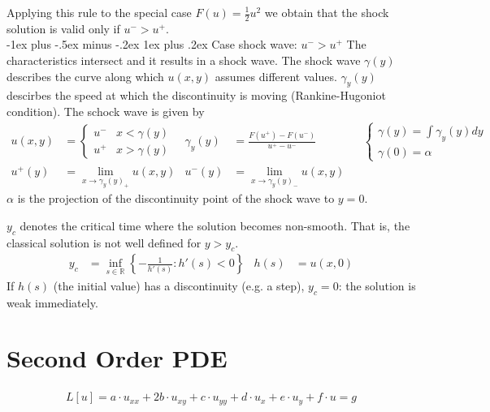 \documentclass[10pt,landscape]{scrartcl}
\makeatletter
\renewcommand{\subsubsection}{\@startsection{subsubsection}{3}{0mm}%
                                {-1ex plus -.5ex minus -.2ex}%
                                {1ex plus .2ex}%
                                {\normalfont\small\bfseries}}
\makeatother
\begin{document}
\begin{multicols*}{2}
Applying this rule to the special case $F(u)=\frac{1}{2}u^2$ we obtain that the shock solution is valid only if $u^- > u^+$.
\\
\subsubsection{Case shock wave: $u^- > u^+$} 
The characteristics intersect and it results in a shock wave. The shock wave $\gamma(y)$ describes the curve along which $u(x,y)$ assumes different values. $\gamma_y(y)$ descirbes the speed at which the discontinuity is moving (Rankine-Hugoniot condition).  The schock wave is given by
\begin{align*}
  u(x,y) &= \begin{cases} u^- & x < \gamma(y) \\ u^+ & x > \gamma(y) \end{cases} &
  \gamma_y(y) &= \frac{F(u^+) - F(u^-)}{u^+-u^-} &
  &\begin{cases} \gamma(y) = \int \gamma_y(y)dy \\ \gamma(0) = \alpha \end{cases} \\
  u^+(y) &= \lim_{x \to \gamma_y(y)_+} u(x,y) & u^-(y) &= \lim_{x \to \gamma_y(y)_-} u(x,y)
\end{align*}
$\alpha$ is the projection of the discontinuity point of the shock wave to $y = 0$.

$y_c$ denotes the critical time where the solution becomes non-smooth. That is, the classical solution is not well defined for $y>y_c$.
\begin{align*}
  y_c &= \inf_{s \in \mathbb{R}} \left\{ -\frac{1}{h'(s)} : h'(s) < 0 \right\} &
  h(s) &= u(x,0)
\end{align*}
If $h(s)$ (the initial value) has a discontinuity (e.g. a step), $y_c = 0$: the solution is weak immediately.


\vfill\null
\columnbreak
\section{Second Order PDE}
\begin{align*}
  L [u] = a \cdot u_{xx} + 2b\cdot u_{xy} + c\cdot u_{yy} + d\cdot u_x + e\cdot u_y + f\cdot u = g
\end{align*}


\end{multicols*}
\end{document}
